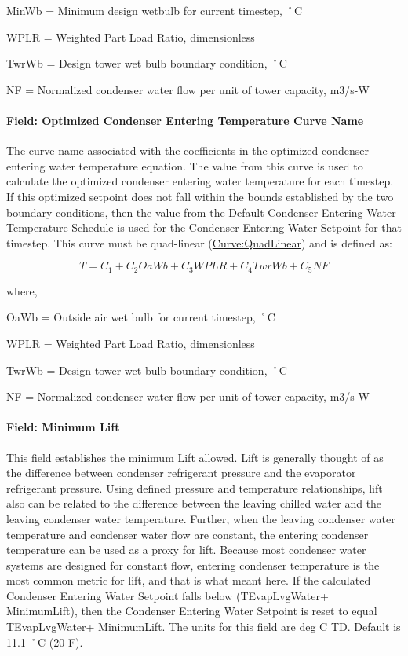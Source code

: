 MinWb = Minimum design wetbulb for current timestep, ˚C

WPLR = Weighted Part Load Ratio, dimensionless

TwrWb = Design tower wet bulb boundary condition, ˚C

NF = Normalized condenser water flow per unit of tower capacity, m3/s-W

\paragraph{Field: Optimized Condenser Entering Temperature Curve Name}\label{field-optimized-condenser-entering-temperature-curve-name}

The curve name associated with the coefficients in the optimized condenser entering water temperature equation. The value from this curve is used to calculate the optimized condenser entering water temperature for each timestep. If this optimized setpoint does not fall within the bounds established by the two boundary conditions, then the value from the Default Condenser Entering Water Temperature Schedule is used for the Condenser Entering Water Setpoint for that timestep. This curve must be quad-linear (\hyperref[curvequadlinear]{Curve:QuadLinear}) and is defined as:

\begin{equation}
T = {C_1} + {C_2}OaWb + {C_3}WPLR + {C_4}TwrWb + {C_5}NF
\end{equation}

where,

OaWb = Outside air wet bulb for current timestep, ˚C

WPLR = Weighted Part Load Ratio, dimensionless

TwrWb = Design tower wet bulb boundary condition, ˚C

NF = Normalized condenser water flow per unit of tower capacity, m3/s-W

\paragraph{Field: Minimum Lift}\label{field-minimum-lift}

This field establishes the minimum Lift allowed. Lift is generally thought of as the difference between condenser refrigerant pressure and the evaporator refrigerant pressure. Using defined pressure and temperature relationships, lift also can be related to the difference between the leaving chilled water and the leaving condenser water temperature. Further, when the leaving condenser water temperature and condenser water flow are constant, the entering condenser temperature can be used as a proxy for lift. Because most condenser water systems are designed for constant flow, entering condenser temperature is the most common metric for lift, and that is what meant here. If the calculated Condenser Entering Water Setpoint falls below (TEvapLvgWater+ MinimumLift), then the Condenser Entering Water Setpoint is reset to equal TEvapLvgWater+ MinimumLift. The units for this field are deg C TD. Default is 11.1 ˚C (20 F).

